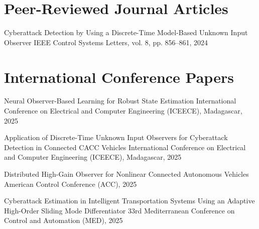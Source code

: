 \vspace{-30pt}
\vspace{-30pt}

\section*{Peer-Reviewed Journal Articles}

{Cyberattack Detection by Using a Discrete-Time Model-Based Unknown Input Observer}
{IEEE Control Systems Letters, vol. 8, pp. 856--861, 2024}

\section*{International Conference Papers}

{Neural Observer-Based Learning for Robust State Estimation}
{International Conference on Electrical and Computer Engineering (ICEECE), Madagascar, 2025}



{Application of Discrete-Time Unknown Input Observers for Cyberattack Detection in Connected CACC Vehicles}
{International Conference on Electrical and Computer Engineering (ICEECE), Madagascar, 2025}

{Distributed High-Gain Observer for Nonlinear Connected Autonomous Vehicles}
{American Control Conference (ACC), 2025}

{Cyberattack Estimation in Intelligent Transportation Systems Using an Adaptive High-Order Sliding Mode Differentiator}
{33rd Mediterranean Conference on Control and Automation (MED), 2025}

